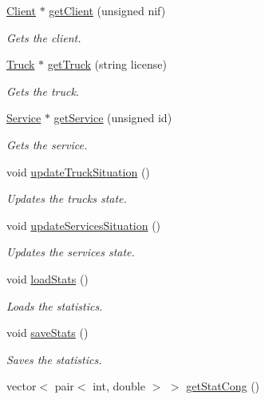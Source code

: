 \begin{DoxyCompactItemize}
\hyperlink{class_client}{Client} $\ast$ \hyperlink{class_company_ae8efdaf521467fd204c8d272f4469679}{get\+Client} (unsigned nif)
\begin{DoxyCompactList}\small\item\em Gets the client. \end{DoxyCompactList}\item 
\hyperlink{class_truck}{Truck} $\ast$ \hyperlink{class_company_acb9c7285e4ca619899017bd1221a1d27}{get\+Truck} (string license)
\begin{DoxyCompactList}\small\item\em Gets the truck. \end{DoxyCompactList}\item 
\hyperlink{class_service}{Service} $\ast$ \hyperlink{class_company_acf80072e8abec3e359387243d8cdc49f}{get\+Service} (unsigned id)
\begin{DoxyCompactList}\small\item\em Gets the service. \end{DoxyCompactList}\item 
void \hyperlink{class_company_af058ee612ca75f1bbd6507e078e5de0a}{update\+Truck\+Situation} ()
\begin{DoxyCompactList}\small\item\em Updates the truck\textquotesingle{}s state. \end{DoxyCompactList}\item 
void \hyperlink{class_company_ae5ce2e4c8d26951b71ca73c7589f6875}{update\+Services\+Situation} ()
\begin{DoxyCompactList}\small\item\em Updates the services\textquotesingle{} state. \end{DoxyCompactList}\item 
void \hyperlink{class_company_a1e471fb69b7924e03cfdc01c3692f26c}{load\+Stats} ()
\begin{DoxyCompactList}\small\item\em Loads the statistics. \end{DoxyCompactList}\item 
void \hyperlink{class_company_aa5b12f509c71984f7346b14cff38ea50}{save\+Stats} ()
\begin{DoxyCompactList}\small\item\em Saves the statistics. \end{DoxyCompactList}\item 
vector$<$ pair$<$ int, double $>$ $>$ \hyperlink{class_company_a46ae11a39256db9dbf2941c58df579c5}{get\+Stat\+Cong} ()

\end{DoxyCompactItemize}
